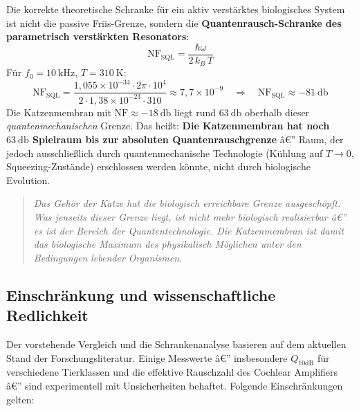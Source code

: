﻿\documentclass[12pt,a4paper,titlepage]{report}
\begin{document}
Die korrekte theoretische Schranke für ein aktiv verstärktes biologisches System
ist nicht die passive Friis-Grenze, sondern die \textbf{Quantenrausch-Schranke
des parametrisch verstärkten Resonators}:
\[
  \mathrm{NF}_{\text{SQL}} = \frac{\hbar\omega}{2\,k_B\,T}
\]
Für $f_0 = \SI{10}{\kilo\hertz}$, $T = \SI{310}{\kelvin}$:
\[
  \mathrm{NF}_{\text{SQL}} = \frac{1{,}055\times10^{-34}\cdot 2\pi\cdot 10^4}
  {2\cdot1{,}38\times10^{-23}\cdot310}
  \approx 7{,}7\times10^{-9}
  \quad\Rightarrow\quad
  \mathrm{NF}_{\text{SQL}} \approx \SI{-81}{\decibel}
\]
Die Katzenmembran mit $\mathrm{NF} \approx \SI{-18}{\decibel}$ liegt
rund $\SI{63}{\decibel}$ oberhalb dieser \emph{quantenmechanischen} Grenze.
Das heißt: \textbf{Die Katzenmembran hat noch $\SI{63}{\decibel}$ Spielraum
bis zur absoluten Quantenrauschgrenze} â€” Raum, der jedoch ausschließlich durch
quantenmechanische Technologie (Kühlung auf $T \to 0$, Squeezing-Zustände)
erschlossen werden könnte, nicht durch biologische Evolution.

\begin{quote}
  \itshape
  Das Gehör der Katze hat die biologisch erreichbare Grenze ausgeschöpft.
  Was jenseits dieser Grenze liegt, ist nicht mehr biologisch realisierbar â€”
  es ist der Bereich der Quantentechnologie.
  Die Katzenmembran ist damit das biologische Maximum des physikalisch Möglichen
  unter den Bedingungen lebender Organismen.
\end{quote}

\subsection{Einschränkung und wissenschaftliche Redlichkeit}

Der vorstehende Vergleich und die Schrankenanalyse basieren auf dem aktuellen
Stand der Forschungsliteratur. Einige Messwerte â€” insbesondere $Q_{10\text{dB}}$
für verschiedene Tierklassen und die effektive Rauschzahl des Cochlear Amplifiers â€”
sind experimentell mit Unsicherheiten behaftet. Folgende Einschränkungen gelten:
\end{document}
